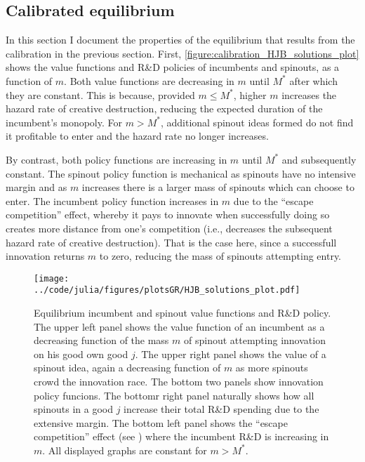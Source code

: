 \documentclass[12pt,english]{article}
\theoremstyle{remark}
\begin{document}
\subsection{Calibrated equilibrium}

In this section I document the properties of the equilibrium that results from the calibration in the previous section. First, \autoref{figure:calibration_HJB_solutions_plot} shows the value functions and R\&D policies of incumbents and spinouts, as a function of $m$. Both value functions are decreasing in $m$ until $M^*$ after which they are constant. This is because, provided $m \le M^*$, higher $m$ increases the hazard rate of creative destruction, reducing the expected duration of the incumbent's monopoly. For $m > M^*$, additional spinout ideas formed do not find it profitable to enter and the hazard rate no longer increases. 

By contrast, both policy functions are increasing in $m$ until $M^*$ and subsequently constant. The spinout policy function is mechanical as spinouts have no intensive margin and as $m$ increases there is a larger mass of spinouts which can choose to enter. The incumbent policy function increases in $m$ due to the ``escape competition'' effect, whereby it pays to innovate when successfully doing so creates more distance from one's competition (i.e., decreases the subsequent hazard rate of creative destruction). That is the case here, since a successfull innovation returns $m$ to zero, reducing the mass of spinouts attempting entry. 

\begin{figure}[]
	\centering
	\texttt{[image: ../code/julia/figures/plotsGR/HJB\_solutions\_plot.pdf]}
	\caption{Equilibrium incumbent and spinout value functions and R\&D policy. The upper left panel shows the value function of an incumbent as a decreasing function of the mass $m$ of spinout attempting innovation on his good own good $j$. The upper right panel shows the value of a spinout idea, again a decreasing function of $m$ as more spinouts crowd the innovation race. The bottom two panels show innovation policy funcions. The bottomr right panel naturally shows how all spinouts in a good $j$ increase their total R\&D spending due to the extensive margin. The bottom left panel shows the ``escape competition'' effect (see \cite{aghion_competition_2005}) where the incumbent R\&D is increasing in $m$. All displayed graphs are constant for $m > M^*$.}
	\label{figure:calibration_HJB_solutions_plot}
\end{figure}
\end{document}
